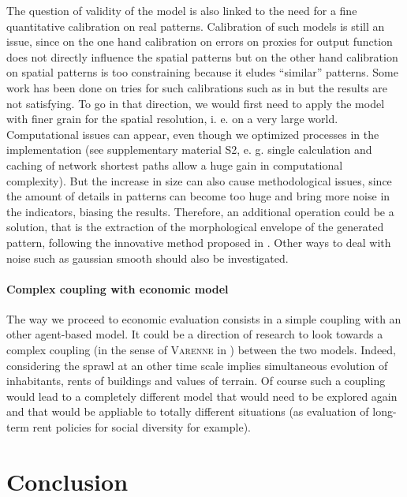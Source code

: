 \documentclass[a4paper,twocolumn,twoside,10pt]{article}
\newcommand{\noun}[1]{\textsc{#1}}
\begin{document}
The question of validity of the model is also linked to the need for
a fine quantitative calibration on real patterns. Calibration of such
models is still an issue, since on the one hand calibration on errors
on proxies for output function does not directly influence the spatial
patterns but on the other hand calibration on spatial patterns is
too constraining because it eludes ``similar'' patterns. Some work
has been done on tries for such calibrations such as in \cite{maria2003stochastic}
but the results are not satisfying. To go in that direction, we would
first need to apply the model with finer grain for the spatial resolution,
i. e. on a very large world. Computational issues can appear, even
though we optimized processes in the implementation (see supplementary
material S2, e. g. single calculation and caching of network shortest
paths allow a huge gain in computational complexity). But the increase
in size can also cause methodological issues, since the amount of
details in patterns can become too huge and bring more noise in the
indicators, biasing the results. Therefore, an additional operation
could be a solution, that is the extraction of the morphological envelope
of the generated pattern, following the innovative method proposed
in \cite{tannier:halshs-00461657,frankhauser2005multi}. Other ways
to deal with noise such as gaussian smooth should also be investigated.

\bigskip{}



\paragraph{Complex coupling with economic model}

The way we proceed to economic evaluation consists in a simple coupling
with an other agent-based model. It could be a direction of research
to look towards a complex coupling (in the sense of \noun{Varenne}
in \cite{varenne2013modeliser}) between the two models. Indeed, considering
the sprawl at an other time scale implies simultaneous evolution of
inhabitants, rents of buildings and values of terrain. Of course such
a coupling would lead to a completely different model that would need
to be explored again and that would be appliable to totally different
situations (as evaluation of long-term rent policies for social diversity
for example).

\bigskip{}



\section{Conclusion}
\end{document}
